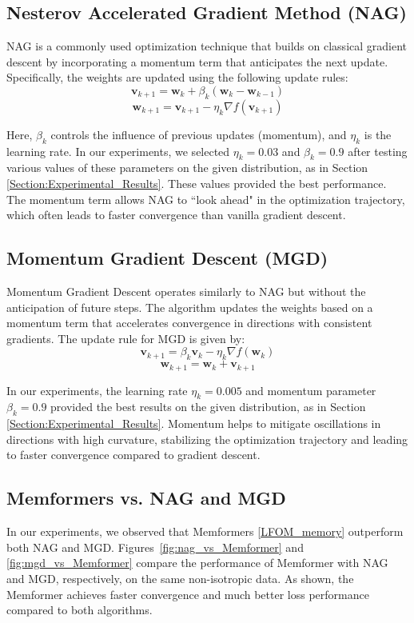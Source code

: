\documentclass[11pt]{article}
\theoremstyle{plain}
\theoremstyle{definition}
\theoremstyle{remark}
\numberwithin{equation}{section}
\begin{document}
\subsection{Nesterov Accelerated Gradient Method (NAG)}

NAG is a commonly used optimization technique that builds on classical gradient descent by incorporating a momentum term that anticipates the next update. Specifically, the weights are updated using the following update rules:
\[
\mathbf{v}_{k+1} = \mathbf{w}_k + \beta_k (\mathbf{w}_k - \mathbf{w}_{k-1})
\]
\[
\mathbf{w}_{k+1} = \mathbf{v}_{k+1} - \eta_k \nabla f(\mathbf{v}_{k+1})
\]

Here, \( \beta_k \) controls the influence of previous updates (momentum), and \( \eta_k \) is the learning rate. In our experiments, we selected \( \eta_k = 0.03 \) and \( \beta_k = 0.9 \) after testing various values of these parameters on the given distribution, as in Section \ref{Section:Experimental_Results}. These values provided the best performance. The momentum term allows NAG to ``look ahead" in the optimization trajectory, which often leads to faster convergence than vanilla gradient descent.

\subsection{Momentum Gradient Descent (MGD)}

Momentum Gradient Descent operates similarly to NAG but without the anticipation of future steps. The algorithm updates the weights based on a momentum term that accelerates convergence in directions with consistent gradients. The update rule for MGD is given by:
\[
\mathbf{v}_{k+1} = \beta_k \mathbf{v}_k - \eta_k \nabla f(\mathbf{w}_k)
\]
\[
\mathbf{w}_{k+1} = \mathbf{w}_k + \mathbf{v}_{k+1}
\]

In our experiments, the learning rate \( \eta_k = 0.005 \) and momentum parameter \( \beta_k = 0.9 \) provided the best results on the given distribution, as in Section \ref{Section:Experimental_Results}. Momentum helps to mitigate oscillations in directions with high curvature, stabilizing the optimization trajectory and leading to faster convergence compared to gradient descent.

\subsection{Memformers vs. NAG and MGD}

In our experiments, we observed that Memformers \eqref{LFOM_memory} outperform both NAG and MGD. Figures~\ref{fig:nag_vs_Memformer} and \ref{fig:mgd_vs_Memformer} compare the performance of Memformer with NAG and MGD, respectively, on the same non-isotropic data. As shown, the Memformer achieves faster convergence and much better loss performance compared to both algorithms.
\end{document}
